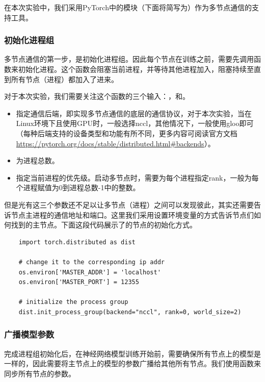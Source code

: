 在本次实验中，我们采用PyTorch中的模块（下面将简写为）作为多节点通信的支持工具。

\subsubsection{初始化进程组}\label{subsubsec:task2-init-process-group}

多节点通信的第一步，是初始化进程组。因此每个节点在训练之前，需要先调用函数来初始化进程。这个函数会阻塞当前进程，并等待其他进程加入，阻塞持续至直到所有节点（进程）都加入了进来。

对于本次实验，我们需要关注这个函数的三个输入：，和。
\begin{itemize}
    \item {}指定通信后端，即实现多节点通信的底层的通信协议，对于本次实验，当在Linux环境下且使用GPU时，一般选择nccl，其他情况下，一般使用gloo即可（每种后端支持的设备类型和功能有所不同，更多内容可阅读官方文档\url{https://pytorch.org/docs/stable/distributed.html#backends}）。
    \item {}为进程总数。
    \item {}指定当前进程的优先级。启动多节点时，需要为每个进程指定rank，一般为每个进程赋值为0到进程总数-1中的整数。
\end{itemize}

但是光有这三个参数还不足以让多节点（进程）之间可以发现彼此，其实还需要告诉节点主进程的通信地址和端口。这里我们采用设置环境变量的方式告诉节点们如何找到的主节点。下面这段代码展示了的节点的初始化方式。
\begin{lstlisting}
    import torch.distributed as dist

    # change it to the corresponding ip addr
    os.environ['MASTER_ADDR'] = 'localhost'
    os.environ['MASTER_PORT'] = 12355
    
    # initialize the process group
    dist.init_process_group(backend="nccl", rank=0, world_size=2)
\end{lstlisting}

\subsubsection{广播模型参数}

完成进程组初始化后，在神经网络模型训练开始前，需要确保所有节点上的模型是一样的，因此需要将主节点上的模型的参数广播给其他所有节点。我们使用函数来同步所有节点的参数。

